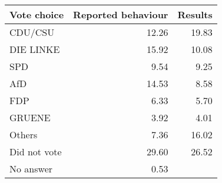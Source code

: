 
\begin{tabular}{l|rr}
\hline
Vote choice & Reported behaviour & Results\\
\hline
CDU/CSU & 12.26 & 19.83\\
DIE LINKE & 15.92 & 10.08\\
SPD & 9.54 & 9.25\\
AfD & 14.53 & 8.58\\
FDP & 6.33 & 5.70\\
GRUENE & 3.92 & 4.01\\
Others & 7.36 & 16.02\\
Did not vote & 29.60 & 26.52\\
No answer & 0.53 & \\
\hline
\end{tabular}
